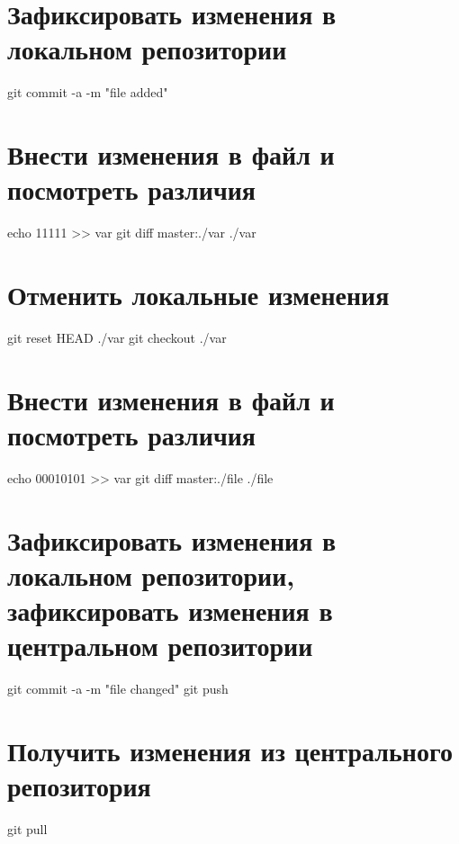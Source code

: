 \documentclass[a4paper,12pt]{article}
\begin{document}
\section[3]{Зафиксировать изменения в локальном репозитории}

\begin{verbatim*}
git commit -a -m "file added"
\end{verbatim*}

\section[4]{Внести изменения в файл и посмотреть различия}

\begin{verbatim*}
echo 11111 >> var
git diff master:./var ./var
\end{verbatim*}

\section[5]{Отменить локальные изменения}

\begin{verbatim*}
git reset HEAD ./var
git checkout ./var
\end{verbatim*}

\section[6]{Внести изменения в файл и посмотреть различия}

\begin{verbatim*}
echo 00010101 >> var
git diff master:./file ./file
\end{verbatim*}

\section[7]{Зафиксировать изменения в локальном репозитории, зафиксировать изменения в центральном репозитории}

\begin{verbatim*}
git commit -a -m "file changed"
git push
\end{verbatim*}

\section[8]{Получить изменения из центрального репозитория}

\begin{verbatim*}
git pull
\end{verbatim*}
\end{document}
